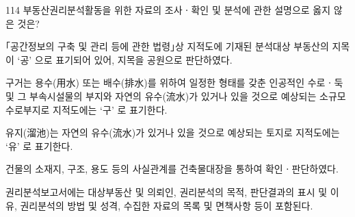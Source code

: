 \begin{question}{114}
부동산권리분석활동을 위한 자료의 조사ㆍ확인 및 분석에 관한 설명으로 옳지 않은 것은?
\begin{choices}
  \item ｢공간정보의 구축 및 관리 등에 관한 법령｣상 지적도에 기재된 분석대상 부동산의 지목이 ‘공’ 으로 표기되어 있어, 지목을 공원으로 판단하였다.
  \item 구거는 용수(用水) 또는 배수(排水)를 위하여 일정한 형태를 갖춘 인공적인 수로ㆍ둑 및 그 부속시설물의 부지와 자연의 유수(流水)가 있거나 있을 것으로 예상되는 소규모 수로부지로 지적도에는 ‘구’ 로 표기한다.
  \item 유지(溜池)는 자연의 유수(流水)가 있거나 있을 것으로 예상되는 토지로 지적도에는 ‘유’ 로 표기한다.
  \item 건물의 소재지, 구조, 용도 등의 사실관계를 건축물대장을 통하여 확인ㆍ판단하였다.
  \item 권리분석보고서에는 대상부동산 및 의뢰인, 권리분석의 목적, 판단결과의 표시 및 이유, 권리분석의 방법 및 성격, 수집한 자료의 목록 및 면책사항 등이 포함된다.
\end{choices}
\end{question}
